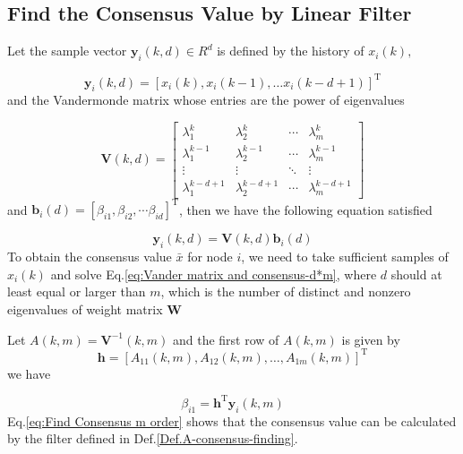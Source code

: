 \subsection{\label{sub:Find-the-Consensus}Find the Consensus Value by Linear
Filter}

Let the sample vector $\mathbf{y}_{i}(k,d)\in R^{d}$ is defined by
the history of $x_{i}(k),$ 

\begin{equation}
\mathbf{y}_{i}(k,d)=\left[x_{i}(k),x_{i}(k-1),\ldots x_{i}(k-d+1)\right]^{\mathrm{T}}\label{eq:def. y(k,m)}
\end{equation}
and the Vandermonde matrix whose entries are the power of eigenvalues

\begin{equation}
\mathbf{V}(k,d)=\left[\begin{array}{cccc}
\lambda_{1}^{k} & \lambda_{2}^{k} & \cdots & \lambda_{m}^{k}\\
\lambda_{1}^{k-1} & \lambda_{2}^{k-1} & \cdots & \lambda_{m}^{k-1}\\
\vdots & \vdots & \ddots & \vdots\\
\lambda_{1}^{k-d+1} & \lambda_{2}^{k-d+1} & \cdots & \lambda_{m}^{k-d+1}
\end{array}\right]\label{eq:def. Lamda(k,m)}
\end{equation}
and $\mathbf{b}_{i}\left(d\right)=\left[\beta_{i1},\beta_{i2},\cdots\beta_{id}\right]^{\mathrm{T}}$,
then we have the following equation satisfied

\begin{equation}
\mathbf{y}_{i}(k,d)=\mathbf{V}(k,d)\mathbf{b}_{i}\left(d\right)\label{eq:Vander matrix and consensus-d*m}
\end{equation}
To obtain the consensus value $\bar{x}$ for node $i$, we need to
take sufficient samples of $x_{i}(k)$\textbf{ }and solve Eq.\eqref{eq:Vander matrix and consensus-d*m},
where $d$ should at least equal or larger than\textbf{ $m$}, which
is the number of distinct and nonzero eigenvalues of weight matrix
$\mathbf{W}$

Let $A(k,m)=\mathbf{V}^{-1}(k,m)$ and the first row of $A(k,m)$
is given by 
\begin{equation}
\mathbf{h}=\left[A_{11}(k,m),A_{12}(k,m),\ldots,A_{1m}(k,m)\right]^{\mathrm{T}}
\end{equation}
 we have 

\begin{equation}
\beta_{i1}=\mathbf{h}^{\mathrm{T}}\mathbf{y}_{i}(k,m)\label{eq:Find Consensus m order}
\end{equation}
 Eq.\eqref{eq:Find Consensus m order} shows that the consensus value
can be calculated by the filter defined in Def.\ref{Def.A-consensus-finding}. 

